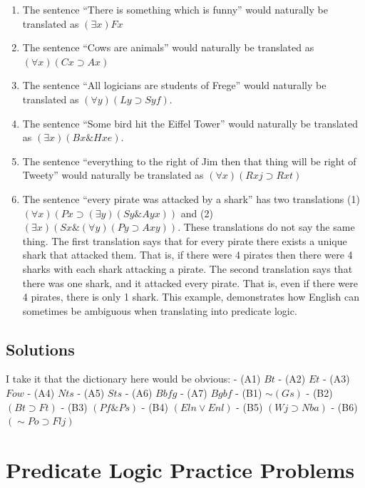 \documentclass[
]{book}
\providecommand{\tightlist}{%
  \setlength{\itemsep}{0pt}\setlength{\parskip}{0pt}}
\begin{document}
\begin{enumerate}
\def\labelenumi{\arabic{enumi}.}
\tightlist
\item
  The sentence ``There is something which is funny'' would naturally be translated as \((\exists x) Fx\)
\item
  The sentence ``Cows are animals'' would naturally be translated as \((\forall x)(Cx \supset Ax)\)
\item
  The sentence ``All logicians are students of Frege'' would naturally be translated as \((\forall y)(Ly \supset Syf)\).
\item
  The sentence ``Some bird hit the Eiffel Tower'' would naturally be translated as \((\exists x) (Bx \& Hxe)\).
\item
  The sentence ``everything to the right of Jim then that thing will be right of Tweety'' would naturally be translated as \((\forall x)(Rxj \supset Rxt)\)
\item
  The sentence ``every pirate was attacked by a shark'' has two translations (1) \((\forall x) (Px \supset (\exists y)(Sy \& Ayx))\) and (2)\((\exists x)(Sx \& (\forall y)(Py \supset Axy))\). These translations do not say the same thing. The first translation says that for every pirate there exists a unique shark that attacked them. That is, if there were 4 pirates then there were 4 sharks with each shark attacking a pirate. The second translation says that there was one shark, and it attacked every pirate. That is, even if there were 4 pirates, there is only 1 shark. This example, demonstrates how English can sometimes be ambiguous when translating into predicate logic.
\end{enumerate}

\hypertarget{solutions-2}{%
\section{Solutions}\label{solutions-2}}

I take it that the dictionary here would be obvious:
- (A1) \(Bt\)
- (A2) \(Et\)
- (A3) \(Fow\)
- (A4) \(Nts\)
- (A5) \(Sts\)
- (A6) \(Bbfg\)
- (A7) \(Bgbf\)
- (B1) \(\sim(Gs)\)
- (B2) \((Bt \supset Ft)\)
- (B3) \((Pf \& Ps)\)
- (B4) \((Eln \lor Enl)\)
- (B5) \((Wj \supset Nba)\)
- (B6) \((\sim Po \supset Flj)\)

\hypertarget{predicate-logic-practice-problems}{%
\chapter{Predicate Logic Practice Problems}\label{predicate-logic-practice-problems}}
\end{document}
